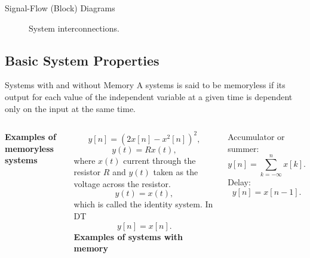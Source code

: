 \begin{frame}[plain]{Signal-Flow (Block) Diagrams}
    \begin{figure}
        \centering
        
        \caption{System interconnections.}\label{fi:sys_interconnections}
    \end{figure}
\end{frame}

\subsection{Basic System Properties}

\begin{frame}{Systems with and without Memory}
    A systems is said to be \alert{memoryless}  if its output for each value of the independent variable at a given time is dependent only on the input at the same time.
    \vspace{0.1in}
    \par
    \begin{columns}
            \textbf{Examples of memoryless systems}\par
            \begin{equation*}
                y[n] = (2x[n] - x^2[n])^2,
            \end{equation*}
            \begin{equation*}
                y(t) = Rx(t),
            \end{equation*}
            where $x(t)$ current through the resistor $R$ and $y(t)$ taken as the voltage across the resistor.
            \begin{equation*}
                y(t) = x(t),
            \end{equation*}
            which is called the \alert{identity system}. In DT
            \begin{equation*}
                y[n] = x[n].
            \end{equation*}
            \textbf{Examples of systems with memory}\par
            Accumulator or summer:
            \begin{equation*}
                y[n] = \sum_{k=-\infty}^{n}x[k].
            \end{equation*}
            Delay:
            \begin{equation*}
                y[n] = x[n-1].
            \end{equation*}

\end{columns}
\end{frame}
